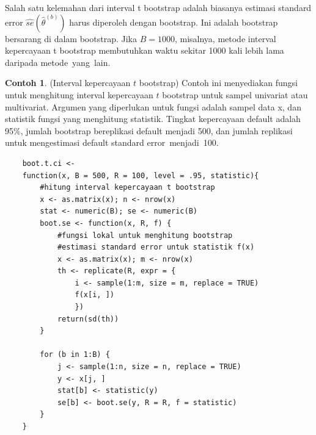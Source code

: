 \documentclass[a4paper,12pt]{article}
\theoremstyle{definition}
\newtheorem{example}{Contoh}[section]
\begin{document}
Salah satu kelemahan dari interval t bootstrap adalah biasanya estimasi standard error $\widehat{se}(\hat{\theta}^{(b)})$ harus diperoleh dengan bootstrap. Ini adalah bootstrap bersarang di dalam bootstrap. Jika $B = 1000$, misalnya, metode interval kepercayaan t bootstrap membutuhkan waktu sekitar 1000 kali lebih lama daripada metode yang lain.
\begin{example} (Interval kepercayaan $t$ bootstrap)
Contoh ini menyediakan fungsi untuk menghitung interval kepercayaan $t$ bootstrap untuk sampel univariat atau multivariat. Argumen yang diperlukan untuk fungsi adalah sampel data x, dan statistik fungsi yang menghitung statistik. Tingkat kepercayaan default adalah 95\%, jumlah bootstrap bereplikasi default menjadi 500, dan jumlah replikasi untuk mengestimasi default standard error menjadi 100.
\end{example}
\begin{lstlisting}
    boot.t.ci <-
    function(x, B = 500, R = 100, level = .95, statistic){
        #hitung interval kepercayaan t bootstrap
        x <- as.matrix(x); n <- nrow(x)
        stat <- numeric(B); se <- numeric(B)
        boot.se <- function(x, R, f) {
            #fungsi lokal untuk menghitung bootstrap
            #estimasi standard error untuk statistik f(x)
            x <- as.matrix(x); m <- nrow(x)
            th <- replicate(R, expr = {
                i <- sample(1:m, size = m, replace = TRUE)
                f(x[i, ])
                })
            return(sd(th))
        }

        for (b in 1:B) {
            j <- sample(1:n, size = n, replace = TRUE)
            y <- x[j, ]
            stat[b] <- statistic(y)
            se[b] <- boot.se(y, R = R, f = statistic)
        }
    }
\end{lstlisting}
\end{document}
